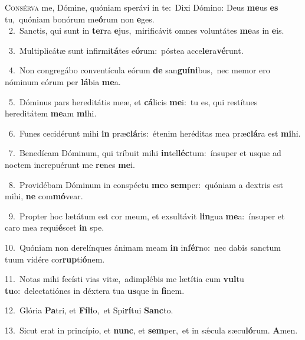 \lettrine{\initial\textcolor{\initialcolor}{C}}{onsérva} me, Dómine, quóniam sperávi in te:~\dagger Dixi Dómino: Deus \textbf{me}\-us \textbf{es} tu,~\star quóniam bonórum me\-\textbf{ó}\-rum non \textbf{e}\-ges.\\
{\numbfont\textcolor{\numbcolor}{~2.}}~Sanctis, qui sunt in \textbf{ter}\-ra \textbf{e}\-jus,~\star mirificávit omnes voluntátes \textbf{me}\-as in \textbf{e}\-is.\par
{\numbfont\textcolor{\numbcolor}{~3.}}~Multiplicátæ sunt infirmi\-\textbf{tá}\-tes e\-\textbf{ó}\-rum:~\star póstea acce\-\textbf{le}\-ra\-\textbf{vé}\-runt.\par
{\numbfont\textcolor{\numbcolor}{~4.}}~Non congregábo conventícula eórum \textbf{de} san\-\textbf{guí}\-\textbf{ni}bus,~\star nec memor ero nóminum eórum per \textbf{lá}\-bia \textbf{me}\-a.\par
{\numbfont\textcolor{\numbcolor}{~5.}}~Dóminus pars hereditátis meæ, et \textbf{cá}\-licis \textbf{me}\-i:~\star tu es, qui restítues hereditátem \textbf{me}\-am \textbf{mi}\-hi.\par
{\numbfont\textcolor{\numbcolor}{~6.}}~Funes cecidérunt mihi \textbf{in} præ\-\textbf{clá}\-ris:~\star étenim heréditas mea præ\-\textbf{clá}\-ra est \textbf{mi}\-hi.\par
{\numbfont\textcolor{\numbcolor}{~7.}}~Benedícam Dóminum, qui tríbuit mihi \textbf{in}\-tel\-\textbf{léc}\-tum:~\star ínsuper et usque ad noctem increpuérunt me \textbf{re}\-nes \textbf{me}\-i.\par
{\numbfont\textcolor{\numbcolor}{~8.}}~Providébam Dóminum in conspéctu \textbf{me}\-o \textbf{sem}\-per:~\star quóniam a dextris est mihi, \textbf{ne} com\-\textbf{mó}\-vear.\par
{\numbfont\textcolor{\numbcolor}{~9.}}~Propter hoc lætátum est cor meum, et exsultávit \textbf{lin}\-gua \textbf{me}\-a:~\star ínsuper et caro mea requi\-\textbf{é}\-scet \textbf{in} spe.\par
{\numbfont\textcolor{\numbcolor}{10.}}~Quóniam non derelínques ánimam meam \textbf{in} in\-\textbf{fér}\-no:~\star nec dabis sanctum tuum vidére cor\-\textbf{rup}\-ti\-\textbf{ó}\-nem.\par
{\numbfont\textcolor{\numbcolor}{11.}}~Notas mihi fecísti vias vitæ,~\dagger adimplébis me lætítia cum \textbf{vul}\-tu \textbf{tu}\-o:~\star delectatiónes in déxtera tua \textbf{us}\-que in \textbf{fi}\-nem.\par
{\numbfont\textcolor{\numbcolor}{12.}}~Glória \textbf{Pa}\-tri, et \textbf{Fí}\-\textbf{li}o,~\star et Spi\-\textbf{rí}\-tui \textbf{Sanc}\-to.\par
{\numbfont\textcolor{\numbcolor}{13.}}~Sicut erat in princípio, et \textbf{nunc}\-, et \textbf{sem}\-per,~\star et in sǽcula sæcu\-\textbf{ló}\-rum. \textbf{A}\-men.\par
